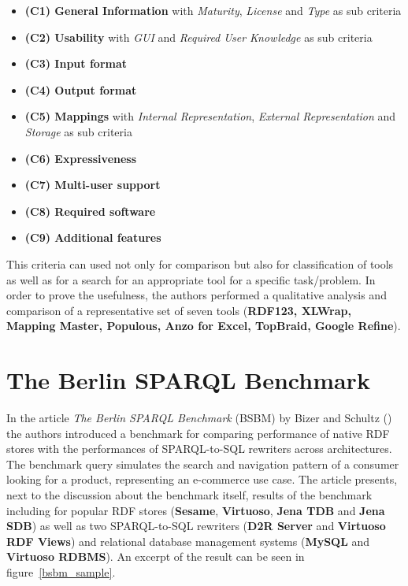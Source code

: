 \begin{itemize}
\item \textbf{(C1) General Information} with \textit{Maturity}, \textit{License} and \textit{Type} as sub criteria
\item \textbf{(C2) Usability} with \textit{GUI} and \textit{Required User Knowledge} as sub criteria
\item \textbf{(C3) Input format}
\item \textbf{(C4) Output format}
\item \textbf{(C5) Mappings} with \textit{Internal Representation}, \textit{External Representation} and \textit{Storage} as sub criteria
\item \textbf{(C6) Expressiveness}
\item \textbf{(C7) Multi-user support}
\item \textbf{(C8) Required software}
\item \textbf{(C9) Additional features}
\end{itemize}

This criteria can used not only for comparison but also for classification of tools as well as for a search for an appropriate tool for a specific task/problem. In order to prove the usefulness, the authors performed a qualitative analysis and comparison of a representative set of seven tools (\textbf{RDF123, XLWrap, Mapping Master, Populous, Anzo for Excel, TopBraid, Google Refine}). 

\section{The Berlin SPARQL Benchmark}

In the article \textit{The Berlin SPARQL Benchmark} (BSBM) by Bizer and Schultz (\cite{bizer2009berlin}) the authors introduced a benchmark for comparing performance of native RDF stores with the performances of SPARQL-to-SQL rewriters across architectures. The benchmark query simulates the search and navigation pattern of a consumer looking for a product, representing an e-commerce use case. The article presents, next to the discussion about the benchmark itself, results of the benchmark including for popular RDF stores (\textbf{Sesame}, \textbf{Virtuoso}, \textbf{Jena TDB} and \textbf{Jena SDB}) as well as two SPARQL-to-SQL rewriters (\textbf{D2R Server} and \textbf{Virtuoso RDF Views}) and relational database management systems (\textbf{MySQL} and \textbf{Virtuoso RDBMS}). An excerpt of the result can be seen in figure~\ref{bsbm_sample}.


